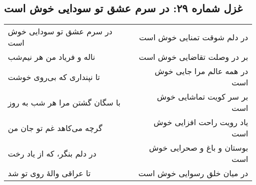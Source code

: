 \begin{center}
\section*{غزل شماره ۲۹: در سرم عشق تو سودایی خوش است}
\label{sec:029}
\begin{longtable}{l p{0.5cm} r}
در سرم عشق تو سودایی خوش است
&&
در دلم شوقت تمنایی خوش است
\\
ناله و فریاد من هر نیم‌شب
&&
بر در وصلت تقاضایی خوش است
\\
تا نپنداری که بی‌روی خوشت
&&
در همه عالم مرا جایی خوش است
\\
با سگان گشتن مرا هر شب به روز
&&
بر سر کویت تماشایی خوش است
\\
گرچه می‌کاهد غم تو جان من
&&
یاد رویت راحت افزایی خوش است
\\
در دلم بنگر، که از یاد رخت
&&
بوستان و باغ و صحرایی خوش است
\\
تا عراقی والهٔ روی تو شد
&&
در میان خلق رسوایی خوش است
\\
\end{longtable}
\end{center}
